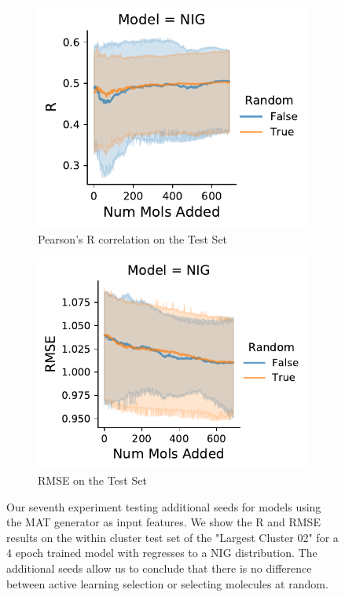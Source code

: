 \documentclass[journal=jmcmar,manuscript=article]{achemso}
\begin{document}
\begin{figure}[tbph]
    \centering
    \begin{subfigure}[b]{0.48\textwidth}
        \includegraphics[width=1\linewidth]{figures/fig7_expanded_MAT_R.pdf}
        \caption{Pearson's R correlation on the Test Set}
    \end{subfigure}%
    \hfill
    \begin{subfigure}[b]{0.48\textwidth}
        \includegraphics[width=1\linewidth]{figures/fig7_expanded_MAT_RMSE.pdf}
        \caption{RMSE on the Test Set}
    \end{subfigure}
    \caption{Our seventh experiment testing additional seeds for models using the MAT generator as input features. We show the R and RMSE results on the within cluster test set of the "Largest Cluster 02" for a 4 epoch trained model with regresses to a NIG distribution. The additional seeds allow us to conclude that there is no difference between active learning selection or selecting molecules at random.}
    \label{fig:expandedMAT}
\end{figure}
\end{document}
